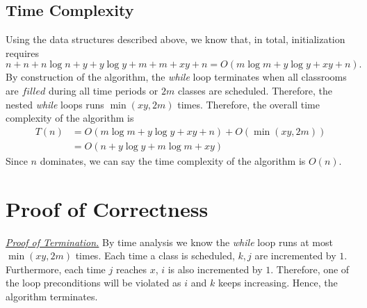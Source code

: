 \documentclass[11pt, oneside]{article}   	%
\begin{document}
\subsection{Time Complexity} %
Using the data structures described above, we know that, in total, initialization requires \[n+n+n\log n+y+y\log y+m+m+xy+n = O(m\log m+y\log y +xy+n).\] By construction of the algorithm, the {\it while} loop terminates when all classrooms are $filled$ during all time periods or $2m$ classes are scheduled. Therefore, the nested {\it while} loops runs $\min(xy, 2m)$ times. Therefore, the overall time complexity of the algorithm is 
\begin{align*}
T(n) &= O(m\log m+y\log y +xy+n)+O(\min(xy, 2m))\\
& = O(n+y\log y+m\log m +xy)
\end{align*}
Since $n$ dominates, we can say the time complexity of the algorithm is $O(n)$.

\section{Proof of Correctness}
\underline{\textit{Proof of Termination.}} By time analysis we know the {\it while} loop runs at most $\min(xy, 2m)$ times. Each time a class is scheduled, $k, j$ are incremented by $1$. Furthermore, each time $j$ reaches $x$, $i$ is also incremented by $1$. Therefore, one of the loop preconditions will be violated as $i$ and $k$ keeps increasing. Hence, the algorithm terminates.
\end{document}
